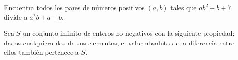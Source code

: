 \begin{exercise}
    Encuentra todos los pares de números positivos $(a, b)$ tales que $ab^2 + b + 7$ divide a $a^2b + a + b$.
\end{exercise}

Sea $S$ un conjunto infinito de enteros no negativos con la siguiente propiedad: dados cualquiera dos de sus elementos, el valor absoluto de la diferencia entre ellos también pertenece a $S$.
